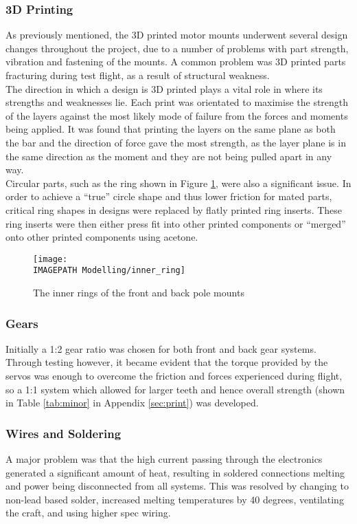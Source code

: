 \subsubsection*{3D Printing}
As previously mentioned, the 3D printed motor mounts underwent several design changes throughout the project, due to a number of problems with part strength, vibration and fastening of the mounts. A common problem was 3D printed parts fracturing during test flight, as a result of structural weakness.\\

The direction in which a design is 3D printed plays a vital role in where its strengths and weaknesses lie. Each print was orientated to maximise the strength of the layers against the most likely mode of failure from the forces and moments being applied. It was found that printing the layers on the same plane as both the bar and the direction of force gave the most strength, as the layer plane is in the same direction as the moment and they are not being pulled apart in any way.\\

Circular parts, such as the ring shown in Figure \ref{fig:innerring}, were also a significant issue. In order to achieve a ``true'' circle shape and thus lower friction for mated parts, critical ring shapes in designs were replaced by flatly printed ring inserts. These ring inserts were then either press fit into other printed components or ``merged'' onto other printed components using acetone. 

\begin{figure}[!ht]
	\centering
	\texttt{[image: \\IMAGEPATH Modelling/inner\_ring]}
	\caption{The inner rings of the front and back pole mounts}
	\label{fig:innerring}
\end{figure}

\subsubsection*{Gears}
Initially a 1:2 gear ratio was chosen for both front and back gear systems. Through testing however, it became evident that the torque provided by the servos was enough to overcome the friction and forces experienced during flight, so a 1:1 system which allowed for larger teeth and hence overall strength (shown in Table \ref{tab:minor} in Appendix \ref{sec:print}) was developed.

\subsubsection*{Wires and Soldering}
A major problem was that the high current passing through the electronics generated a significant amount of heat, resulting in soldered connections melting and power being disconnected from all systems. This was resolved by changing to non-lead based solder, increased melting temperatures by 40 degrees, ventilating the craft, and using higher spec wiring. 

